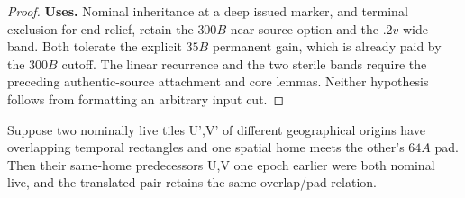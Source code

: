 \begin{proof}
\textbf{Uses.} Nominal inheritance at a deep issued marker, and terminal exclusion for end relief, retain the \(300B\) near-source option and the \(.2v\)-wide band. Both tolerate the explicit \(35B\) permanent gain, which is already paid by the \(300B\) cutoff. The linear recurrence and the two sterile bands require the preceding authentic-source attachment and core lemmas. Neither hypothesis follows from formatting an arbitrary input cut.
\end{proof}

\begin{lemma}\label{lem:inheritance}
Suppose two nominally live tiles U',V' of different geographical origins have overlapping temporal rectangles and one spatial home meets the other's \(64A\) pad. Then their same-home predecessors U,V one epoch earlier were both nominal live, and the translated pair retains the same overlap/pad relation.
\end{lemma}
